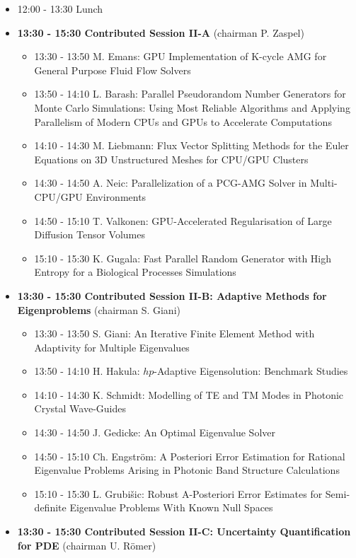\documentclass[10pt, A4]{article}%
\begin{document}
\begin{itemize}
  \item 12:00 - 13:30 Lunch
  \item {\bf 13:30 - 15:30 Contributed Session II-A} (chairman P. Zaspel) 
  \begin{itemize}
    \item 13:30 - 13:50 M. Emans: GPU Implementation of K-cycle AMG for General Purpose Fluid Flow Solvers
    \item 13:50 - 14:10 L. Barash: Parallel Pseudorandom Number Generators for Monte Carlo Simulations: Using Most Reliable Algorithms and Applying Parallelism of Modern CPUs and GPUs to Accelerate Computations
    \item 14:10 - 14:30 M. Liebmann: Flux Vector Splitting Methods for the Euler Equations on 3D Unstructured Meshes for CPU/GPU Clusters
    \item 14:30 - 14:50 A. Neic: Parallelization of a PCG-AMG Solver in Multi-CPU/GPU Environments
    \item 14:50 - 15:10 T. Valkonen: GPU-Accelerated Regularisation of Large Diffusion Tensor Volumes
    \item 15:10 - 15:30 K. Gugala: Fast Parallel Random Generator with High Entropy for a Biological Processes Simulations
  \end{itemize}
  \item {\bf 13:30 - 15:30 Contributed Session II-B: Adaptive Methods for Eigenproblems} (chairman S. Giani) 
  \begin{itemize}
    \item 13:30 - 13:50 S. Giani: An Iterative Finite Element Method with Adaptivity for Multiple Eigenvalues
    \item 13:50 - 14:10 H. Hakula: $hp$-Adaptive Eigensolution: Benchmark Studies
    \item 14:10 - 14:30 K. Schmidt: Modelling of TE and TM Modes in Photonic Crystal Wave-Guides
    \item 14:30 - 14:50 J. Gedicke: An Optimal Eigenvalue Solver
    \item 14:50 - 15:10 Ch. Engstr\"{o}m: A Posteriori Error Estimation for Rational Eigenvalue Problems Arising in Photonic Band Structure Calculations
    \item 15:10 - 15:30 L. Grubi\v{s}ic: Robust A-Posteriori Error Estimates for Semi-definite Eigenvalue Problems With Known Null Spaces
  \end{itemize}
\newpage
    \item {\bf 13:30 - 15:30 Contributed Session II-C: Uncertainty Quantification for PDE} (chairman U. R\"{o}mer) 

\end{itemize}
\end{document}

